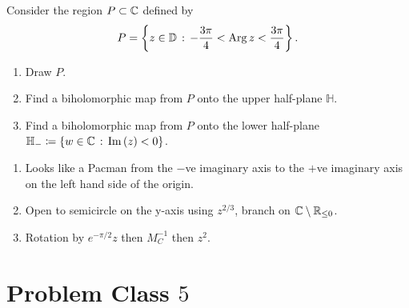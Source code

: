 \documentclass[10pt, a4paper]{article}
\begin{document}
\begin{problem}
    Consider the region $P \subset \mathbb{C}$ defined by
    \[
    P = \left\{z \in \mathbb{D}\,:\,-\frac{3\pi}{4} < \operatorname{Arg}{z} < \frac{3\pi}{4}\right\}.
    \]
    \begin{enumerate}[label = (\alph*)]
        \item Draw $P$.

        \item Find a biholomorphic map from $P$ onto the upper half-plane $\mathbb{H}$.
        
        \item Find a biholomorphic map from $P$ onto the lower half-plane $\mathbb{H}_{-} \coloneqq \{w \in \mathbb{C}\,:\,\mathrm{Im}\,(z) < 0\}$.
    \end{enumerate}

    \begin{solution}
        \begin{enumerate}[label = (\alph*)]
            \item Looks like a Pacman from the $-$ve imaginary axis to the $+$ve imaginary axis on the left hand side of the origin.

            \item Open to semicircle on the y-axis using $z ^ {2 / 3}$,
            branch on $\mathbb{C} \setminus \mathbb{R}_{\leq 0}$.

            \item Rotation by $e ^ {-\pi / 2}z$ then $M_C ^ {-1}$ then $z ^ 2$.
        \end{enumerate}
    \end{solution}
\end{problem}

\newpage

\section{Problem Class \texorpdfstring{$5$}{}}
\end{document}
